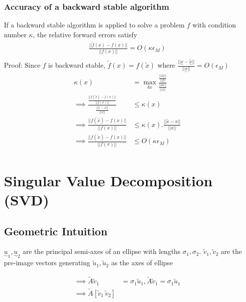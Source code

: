 \documentclass{article}
\newcommand{\T}[1]{\underset{\sim}{#1}}
\begin{document}
\subsubsection{Accuracy of a backward stable algorithm}
\label{sec:accur-backw-stable}

If a backward stable algorithm is applied to solve a problem $f$ with condition number $\kappa$, the relative forward errors satisfy
\begin{align*}
\frac{||\tilde{f}(x) - f(x)||}{||f(x)||} = O(\kappa\epsilon_M)\\
\end{align*}
Proof: Since $f$ is backward stable, $\tilde{f}(x) = f(\tilde{x})$ where $\frac{||\T{x} - \T{\tilde{x}}||}{||\T{x}||} = O(\epsilon_M)$
\begin{align*}
  \kappa(x) &= \max_{\delta x}\frac{\frac{||\delta f||}{||f||}}{\frac{||\delta x||}{||x||}}\\
  \implies \frac{\frac{||f(\tilde{x}) - f(x)||}{||f(x)||}}{\frac{||\tilde{x} - x||}{||x||}} &\leq \kappa(x)\\
  \implies \frac{||f(\tilde{x}) - f(x)||}{||f(x)||} &\leq \kappa(x).\frac{||\tilde{x} - x||}{||x||}\\
  \implies \frac{||f(\tilde{x}) - f(x)||}{||f(x)||} &\leq O(\kappa\epsilon_M)\\
\end{align*}

\section{Singular Value Decomposition (SVD)}
\label{sec:svd}

\subsection{Geometric Intuition}
\label{sec:svd:intuition}

$\T{u}_1 ,\T{u}_2$ are the principal semi-axes of an ellipse with lengths $\sigma_1, \sigma_2$. $\tilde{v}_1, \tilde{v}_2$ are the pre-image vectors generating $\tilde{u}_1, \tilde{u}_2$ as the axes of ellipse

\begin{align*}
  \implies \tilde{A}\tilde{v}_1 &= \sigma_1\tilde{u}_1,
  \tilde{A}\tilde{v}_1 = \sigma_1\tilde{u}_1\\
  \implies \tilde{A}[\tilde{v}_1\,\tilde{v}_2]
\end{align*}
\end{document}
